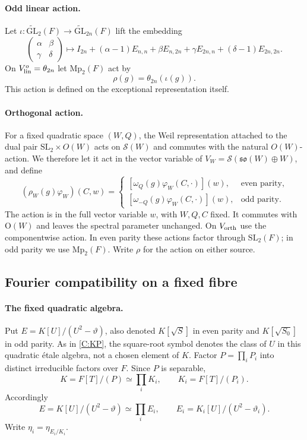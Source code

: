 \documentclass[11pt,oneside,notitlepage]{book}
\numberwithin{equation}{section}
\theoremstyle{plain}
\theoremstyle{definition}
\newcommand{\GL}{\mathrm{GL}}
\newcommand{\SL}{\mathrm{SL}}
\newcommand{\Ort}{\mathrm{O}}
\newcommand{\Mp}{\mathrm{Mp}}
\newcommand{\so}{\mathfrak{so}}
\newcommand{\cS}{\mathcal{S}}
\newcommand{\tGL}{\widetilde{\GL}}
\begin{document}
\paragraph{Odd linear action.} Let $\iota:\tGL_2(F)\to\tGL_{2n}(F)$ lift the embedding
\[
 \begin{pmatrix}\alpha&\beta\\\gamma&\delta\end{pmatrix}
 \longmapsto I_{2n}+(\alpha-1)E_{n,n}+\beta E_{n,2n}
       +\gamma E_{2n,n}+(\delta-1)E_{2n,2n}.
\]
On $V^o_{\rm lin}=\theta_{2n}$ let $\Mp_2(F)$ act by
\[
 \rho(g)=\theta_{2n}(\iota(g)).
\]
This action is defined on the exceptional representation itself.

\paragraph{Orthogonal action.} For a fixed quadratic space \((W,Q)\), the Weil representation attached to the dual pair \(\SL_2\times O(W)\) acts on \(\mathcal S(W)\) and commutes with the natural \(O(W)\)-action. We therefore let it act in the vector variable of
 $V_W=\cS(\so(W)\oplus W)$, and define
\[
 (\rho_W(g)\varphi_W)(C,w)=
 \begin{cases}
  [\omega_Q(g)\varphi_W(C,\cdot)](w),&\text{even parity},\\
  [\omega_{-Q}(g)\varphi_W(C,\cdot)](w),&\text{odd parity}.
 \end{cases}
\]
The action is in the full vector variable $w$, with $W,Q,C$ fixed. It commutes with $\Ort(W)$ and leaves the spectral parameter unchanged. On $V_{\rm orth}$ use the componentwise action. In even parity these actions factor through $\SL_2(F)$; in odd parity we use $\Mp_2(F)$. Write $\rho$ for the action on either source.

\subsection*{Fourier compatibility on a fixed fibre}
\paragraph{The fixed quadratic algebra.}
Put $E=K[U]/(U^2-\vartheta)$, also denoted $K[\sqrt S]$ in even parity and $K[\sqrt{S_0}]$ in odd parity. As in \ref{C:KP}, the square-root symbol denotes the class of $U$ in this quadratic \'etale algebra, not a chosen element of $K$. Factor \(P=\prod_iP_i\) into distinct irreducible factors over \(F\). Since \(P\) is separable,
\[
K=F[T]/(P)\simeq\prod_iK_i,\qquad K_i=F[T]/(P_i).
\]
Accordingly
\[
E=K[U]/(U^2-\vartheta)\simeq\prod_iE_i,
\qquad E_i=K_i[U]/(U^2-\vartheta_i).
\]
Write $\eta_i=\eta_{E_i/K_i}$.
\end{document}
